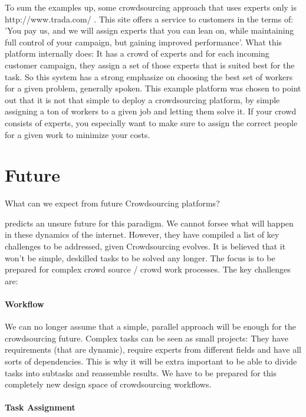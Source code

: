 \documentclass{sig-alternate}
\begin{document}
To sum the examples up, some crowdsourcing approach that uses experts only is http://www.trada.com/ .
This site offers a service to customers in the terms of: 'You pay us, and we will assign experts that you can lean on, while maintaining full control of your campaign, but gaining
improved performance'. What this platform internally does: It has a crowd of experts and for each incoming customer campaign, they assign a set of those experts that is suited best
for the task. So this system has a strong emphasize on choosing the best set of workers for a given problem, generally spoken. 
This example platform was chosen to point out that it is not that simple to deploy a crowdsourcing platform, by simple assigning a ton of workers to a given job and letting them solve it.
If your crowd consists of experts, you especially want to make sure to assign the correct people for a given work to minimize your costs.

\section{Future}

What can we expect from future Crowdsourcing platforms?

\cite{future} predicts an unsure future for this paradigm. We cannot forsee what will happen in these dynamics of the internet. However, they have compiled
a list of key challenges to be addressed, given Crowdsourcing evolves. It is believed that it won't be simple, deskilled tasks to be solved any longer. The focus is to be prepared for complex crowd source / crowd work processes. The key challenges are:  

\paragraph{Workflow}
We can no longer assume that a simple, parallel approach will be enough for the crowdsourcing future. Complex tasks can be seen as small projects:
They have requirements (that are dynamic), require experts from different fields and have all sorts of dependencies.
This is why it will be extra important to be able to divide tasks into subtasks and reassemble results. We have to be prepared for this completely new design 
space of crowdsourcing workflows.

\paragraph{Task Assignment}
\end{document}
